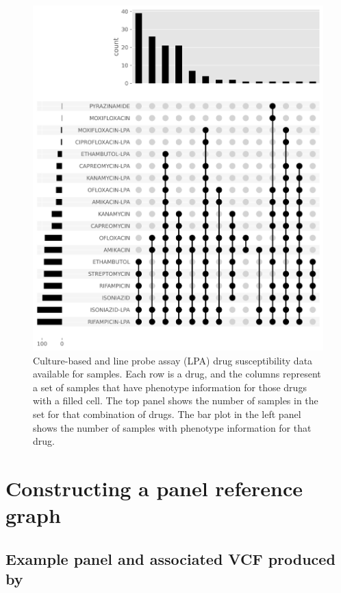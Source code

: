 \begin{figure}
\begin{center}
\includegraphics[width=0.90\columnwidth]{Appendix2/Figs/full-available-dst.png}
\caption{{Culture-based and line probe assay (LPA) drug susceptibility data available for samples. Each row is a drug, and the columns represent a set of samples that have phenotype information for those drugs with a filled cell. The top panel shows the number of samples in the set for that combination of drugs. The bar plot in the left panel shows the number of samples with phenotype information for that drug.
{\label{fig:full-dst}}
}}
\end{center}
\end{figure}

\section{Constructing a panel reference graph}

\subsection{Example panel and associated VCF produced by \drprg{}}

